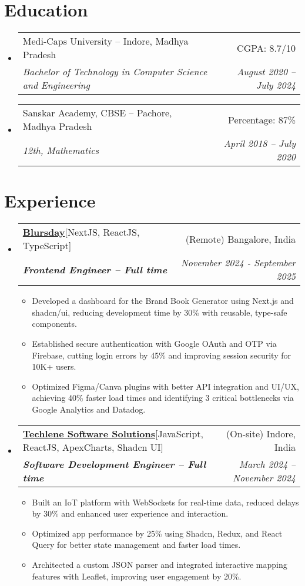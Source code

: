 \documentclass[letterpaper,10pt]{article}
\makeatletter
\newcommand{\resumeItem}[1]{
    \item\small{
      {#1 \vspace{-2pt}}
    }
  }
\newcommand{\resumeSubheading}[4]{
    \vspace{-2pt}\item
      \begin{tabular*}{0.97\textwidth}[t]{l@{\extracolsep{\fill}}r}
        {#1} & #2 \\
        \textit{\small#3} & \textit{\small #4}\\
      \end{tabular*}\vspace{-7pt}
  }
\newcommand{\resumeSubHeadingListStart}{\begin{itemize}[leftmargin=0.15in, label={}]}
\newcommand{\resumeSubHeadingListEnd}{\end{itemize}}
\newcommand{\resumeItemListStart}{\begin{itemize}}
\newcommand{\resumeItemListEnd}{\end{itemize}\vspace{-5pt}}
\makeatother
\begin{document}
\section{Education}
\resumeSubHeadingListStart

\resumeSubheading
{Medi-Caps University -- Indore, Madhya Pradesh}{CGPA: 8.7/10}
  {Bachelor of Technology in Computer Science and Engineering}{August 2020 -- July 2024}
\resumeSubHeadingListEnd

\resumeSubHeadingListStart
\resumeSubheading
  {Sanskar Academy, CBSE -- Pachore, Madhya Pradesh}{Percentage: 87\%}
  {12th, Mathematics}{April 2018 -- July 2020}

\resumeSubHeadingListEnd




\section{Experience}

\resumeSubHeadingListStart
\resumeSubheading
{\textbf{\href{https://www.blursday.ai/}{Blursday}\hspace{5pt}}{{[NextJS, ReactJS, TypeScript]}}}{(Remote) Bangalore, India}
{\textbf{Frontend Engineer – Full time}}{November 2024 - September 2025}
\resumeItemListStart
\resumeItem{Developed a dashboard for the Brand Book Generator using Next.js and shadcn/ui, reducing development time by 30\% with reusable, type-safe components.
}
\resumeItem{Established secure authentication with Google OAuth and OTP via Firebase, cutting login errors by 45\% and improving session security for 10K+ users.
}
\resumeItem{Optimized Figma/Canva plugins with better API integration and UI/UX, achieving 40\% faster load times and identifying 3 critical bottlenecks via Google Analytics and Datadog.
}
\resumeItemListEnd
\resumeSubHeadingListEnd


\resumeSubHeadingListStart
\resumeSubheading
  {\textbf{\href{https://www.techlene.com/}{Techlene Software Solutions}\hspace{5pt}}{[JavaScript, ReactJS, ApexCharts, Shadcn UI]}}{(On-site) Indore, India}
  {\textbf{Software Development Engineer – Full time}}{March 2024 -- November 2024}
  \resumeItemListStart
    \resumeItem{Built an IoT platform with WebSockets for real-time data, reduced delays by 30\% and enhanced user experience and interaction.}
    \resumeItem{Optimized app performance by 25\% using Shadcn, Redux, and React Query for better state management and faster load times.}
    \resumeItem{Architected a custom JSON parser and integrated interactive mapping features with Leaflet, improving user engagement by 20\%.}
  \resumeItemListEnd
\resumeSubHeadingListEnd
\end{document}

